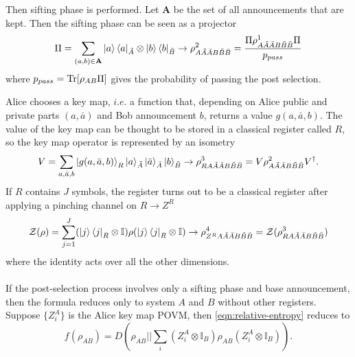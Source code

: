 \documentclass{article}
\begin{document}
    Then sifting phase is performed.
    Let \(\mathbf{A}\) be the set of all announcements that are kept.
    Then the sifting phase can be seen as a projector
    \begin{equation}
        \Pi=\sum_{(a,b)\in\mathbf{A}}\ket{a}\bra{a}_{\tilde{A}}\otimes\ket{b}\bra{b}_{\tilde{B}}\to \rho^2_{A\tilde{A}\bar{A}B\tilde{B}\bar{B}} = \frac{\Pi \rho^1_{A\tilde{A}\bar{A}B\tilde{B}\bar{B}} \Pi}{p_{pass}}
        \label{eqn:sifting}
    \end{equation}
    where \(p_{pass} = \Tr[\rho_{AB}\Pi]\) gives the probability of passing the post selection.

    Alice chooses a key map, \(i.e.\) a function that, depending on Alice public and private parts \((a,\bar{a})\) and Bob announcement \(b\), returns a value \(g(a,\bar{a},b)\).
    The value of the key map can be thought to be stored in a classical register called \(R\), so the key map operator is represented by an isometry
    \begin{equation}
        V = \sum_{a,\bar{a},b}\ket{g(a,\bar{a},b)}_R\ket{a}_{\tilde{A}}\ket{\bar{a}}_{\bar{A}}\ket{b}_{\tilde{B}}\to \rho^3_{RA\tilde{A}\bar{A}B\tilde{B}\bar{B}} = V \rho^2_{A\tilde{A}\bar{A}B\tilde{B}\bar{B}} V^{\dagger}.
        \label{eqn:key-map}
    \end{equation}
    If \(R\) contains \(J\) symbols, the register turns out to be a classical register after applying a pinching channel on \(R\to Z^R\)
    \begin{equation}
        \mathcal{Z}(\rho) = \sum_{j=1}^{J} (\ket{j}\bra{j}_R\otimes\mathbb{I}) \rho (\ket{j}\bra{j}_R\otimes\mathbb{I})\to \rho^4_{Z^RA\tilde{A}\bar{A}B\tilde{B}\bar{B}} = \mathcal{Z}(\rho^3_{RA\tilde{A}\bar{A}B\tilde{B}\bar{B}})
        \label{eqn:pinching}
    \end{equation}
    where the identity acts over all the other dimensions.
    \\
    \\    
    If the post-selection process involves only a sifting phase and base announcement, then the formula reduces only to system \(A\) and \(B\) without other registers.
    Suppose \(\{Z^A_i\}\) is the Alice key map POVM, then \eqref{eqn:relative-entropy} reduces to
    \begin{equation}
        f(\rho_{AB})=D\left(\rho_{AB}\bigg\vert\bigg\vert\sum_i (Z^A_i\otimes\mathbb{I}_B)\rho_{AB} (Z^A_i\otimes\mathbb{I}_B)\right).
        \label{eqn:relative-entropy-simple}
    \end{equation}
\end{document}
